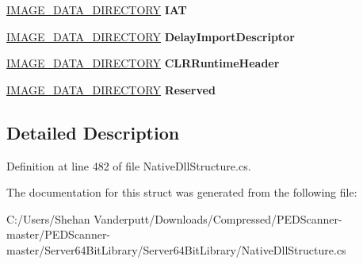 \begin{DoxyCompactItemize}
\mbox{\hyperlink{struct_class_library_server_1_1_struct_1_1_pe_header_reader_1_1_i_m_a_g_e___d_a_t_a___d_i_r_e_c_t_o_r_y}{I\+M\+A\+G\+E\+\_\+\+D\+A\+T\+A\+\_\+\+D\+I\+R\+E\+C\+T\+O\+RY}} {\bfseries I\+AT}
\item 
\mbox{\label{struct_class_library_server_1_1_struct_1_1_pe_header_reader_1_1_i_m_a_g_e___o_p_t_i_o_n_a_l___h_e_a_d_e_r32_a68f14b7d1b5c695f24e075db1aed0534}} 
\mbox{\hyperlink{struct_class_library_server_1_1_struct_1_1_pe_header_reader_1_1_i_m_a_g_e___d_a_t_a___d_i_r_e_c_t_o_r_y}{I\+M\+A\+G\+E\+\_\+\+D\+A\+T\+A\+\_\+\+D\+I\+R\+E\+C\+T\+O\+RY}} {\bfseries Delay\+Import\+Descriptor}
\item 
\mbox{\label{struct_class_library_server_1_1_struct_1_1_pe_header_reader_1_1_i_m_a_g_e___o_p_t_i_o_n_a_l___h_e_a_d_e_r32_a501a7e67e8f6bdf70fd70b5a3c86f306}} 
\mbox{\hyperlink{struct_class_library_server_1_1_struct_1_1_pe_header_reader_1_1_i_m_a_g_e___d_a_t_a___d_i_r_e_c_t_o_r_y}{I\+M\+A\+G\+E\+\_\+\+D\+A\+T\+A\+\_\+\+D\+I\+R\+E\+C\+T\+O\+RY}} {\bfseries C\+L\+R\+Runtime\+Header}
\item 
\mbox{\label{struct_class_library_server_1_1_struct_1_1_pe_header_reader_1_1_i_m_a_g_e___o_p_t_i_o_n_a_l___h_e_a_d_e_r32_af494a32efdba15a74bb528c8b9a07d99}} 
\mbox{\hyperlink{struct_class_library_server_1_1_struct_1_1_pe_header_reader_1_1_i_m_a_g_e___d_a_t_a___d_i_r_e_c_t_o_r_y}{I\+M\+A\+G\+E\+\_\+\+D\+A\+T\+A\+\_\+\+D\+I\+R\+E\+C\+T\+O\+RY}} {\bfseries Reserved}
\end{DoxyCompactItemize}


\subsection{Detailed Description}


Definition at line 482 of file Native\+Dll\+Structure.\+cs.



The documentation for this struct was generated from the following file\+:\begin{DoxyCompactItemize}
\item 
C\+:/\+Users/\+Shehan Vanderputt/\+Downloads/\+Compressed/\+P\+E\+D\+Scanner-\/master/\+P\+E\+D\+Scanner-\/master/\+Server64\+Bit\+Library/\+Server64\+Bit\+Library/Native\+Dll\+Structure.\+cs\end{DoxyCompactItemize}

